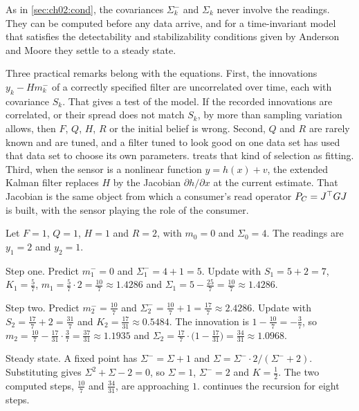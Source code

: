 As in \cref{sec:ch02:cond}, the covariances $\Sigma_k^-$ and $\Sigma_k$ never
involve the readings. They can be computed before any data arrive, and for a
time-invariant model that satisfies the detectability and stabilizability
conditions given by Anderson and Moore they settle to a steady state.

Three practical remarks belong with the equations. First, the innovations
$y_k-Hm_k^-$ of a correctly specified filter are uncorrelated over time, each
with covariance $S_k$. That gives a test of the model. If the recorded
innovations are correlated, or their spread does not match $S_k$, by more
than sampling variation allows, then $F$, $Q$, $H$, $R$ or the initial belief
is wrong. Second, $Q$ and $R$ are rarely known and are tuned, and a
filter tuned to look good on one data set has used that data set to choose its
own parameters.  treats that kind of selection as fitting. Third,
when the sensor is a nonlinear function $y=h(x)+v$, the extended Kalman filter
replaces $H$ by the Jacobian $\partial h/\partial x$ at the current estimate.
That Jacobian is the same object from which a consumer's read operator
$P_C=J^{\top} GJ$ is built, with the sensor playing the role of the consumer.

\begin{example}\label{ex:ch02:kalman}
Let $F=1$, $Q=1$, $H=1$ and $R=2$, with $m_0=0$ and $\Sigma_0=4$. The readings
are $y_1=2$ and $y_2=1$.

Step one. Predict $m_1^-=0$ and $\Sigma_1^-=4+1=5$. Update with $S_1=5+2=7$,
$K_1=\tfrac57$, $m_1=\tfrac57\cdot2=\tfrac{10}7\approx1.4286$ and
$\Sigma_1=5-\tfrac{25}{7}=\tfrac{10}7\approx1.4286$.

Step two. Predict $m_2^-=\tfrac{10}7$ and $\Sigma_2^-=\tfrac{10}7+1=\tfrac{17}7\approx2.4286$.
Update with $S_2=\tfrac{17}7+2=\tfrac{31}7$ and $K_2=\tfrac{17}{31}\approx0.5484$.
The innovation is $1-\tfrac{10}7=-\tfrac37$, so
$m_2=\tfrac{10}7-\tfrac{17}{31}\cdot\tfrac37=\tfrac{37}{31}\approx1.1935$ and
$\Sigma_2=\tfrac{17}7\cdot\big(1-\tfrac{17}{31}\big)=\tfrac{34}{31}\approx1.0968$.

Steady state. A fixed point has $\Sigma^-=\Sigma+1$ and
$\Sigma=\Sigma^-\cdot2/(\Sigma^-+2)$. Substituting gives
$\Sigma^2+\Sigma-2=0$, so $\Sigma=1$, $\Sigma^-=2$ and $K=\tfrac12$. The two
computed steps, $\tfrac{10}7$ and $\tfrac{34}{31}$, are approaching $1$.
 continues the recursion for eight steps.
\end{example}

